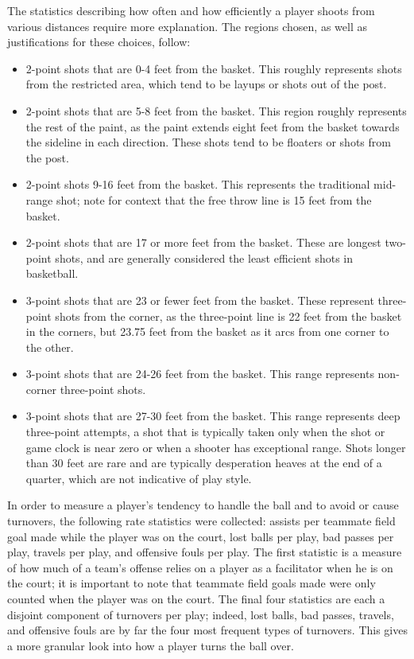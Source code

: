 The statistics describing how often and how efficiently a player shoots from various
distances require more explanation. The regions chosen, as well as justifications
for these choices, follow:

\begin{itemize}
    \item 2-point shots that are 0-4 feet from the basket. This roughly represents
        shots from the restricted area, which tend to be layups or shots out of the
        post.
    \item 2-point shots that are 5-8 feet from the basket. This region roughly
        represents the rest of the paint, as the paint extends eight feet from the
        basket towards the sideline in each direction. These shots tend to be
        floaters or shots from the post.
    \item 2-point shots 9-16 feet from the basket. This represents the traditional
        mid-range shot; note for context that the free throw line is 15 feet from
        the basket.
    \item 2-point shots that are 17 or more feet from the basket. These are longest
        two-point shots, and are generally considered the least efficient shots in
        basketball.
    \item 3-point shots that are 23 or fewer feet from the basket. These represent
        three-point shots from the corner, as the three-point line is 22 feet from
        the basket in the corners, but 23.75 feet from the basket as it arcs from
        one corner to the other.
    \item 3-point shots that are 24-26 feet from the basket. This range represents
        non-corner three-point shots.
    \item 3-point shots that are 27-30 feet from the basket. This range represents
        deep three-point attempts, a shot that is typically taken only when the shot
        or game clock is near zero or when a shooter has exceptional range. Shots
        longer than 30 feet are rare and are typically desperation heaves at the end
        of a quarter, which are not indicative of play style.
\end{itemize}

In order to measure a player's tendency to handle the ball and to avoid or cause
turnovers, the following rate statistics were collected: assists per teammate field
goal made while the player was on the court, lost balls per play, bad passes per
play, travels per play, and offensive fouls per play. The first statistic is a
measure of how much of a team's offense relies on a player as a facilitator when he
is on the court; it is important to note that teammate field goals made were only
counted when the player was on the court. The final four statistics are each a
disjoint component of turnovers per play; indeed, lost balls, bad passes, travels,
and offensive fouls are by far the four most frequent types of turnovers. This gives
a more granular look into how a player turns the ball over.

